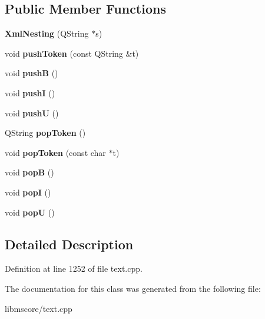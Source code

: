 \subsection*{Public Member Functions}
\begin{DoxyCompactItemize}
\item 
\mbox{\label{class_ms_1_1_xml_nesting_a53b2d7feea754c82c3c0753dabdbf22c}} 
{\bfseries Xml\+Nesting} (Q\+String $\ast$s)
\item 
\mbox{\label{class_ms_1_1_xml_nesting_ac5951c62df1bb683e9d701e2a332b24b}} 
void {\bfseries push\+Token} (const Q\+String \&t)
\item 
\mbox{\label{class_ms_1_1_xml_nesting_aecbfdf50979de2b90ab83b34ae468466}} 
void {\bfseries pushB} ()
\item 
\mbox{\label{class_ms_1_1_xml_nesting_ae0dd8bd06249a337c83cb65b5cafafbc}} 
void {\bfseries pushI} ()
\item 
\mbox{\label{class_ms_1_1_xml_nesting_a7536452053864d7cb6fb98e9b4075ede}} 
void {\bfseries pushU} ()
\item 
\mbox{\label{class_ms_1_1_xml_nesting_ade6092f87c40c940433b3e313df54c58}} 
Q\+String {\bfseries pop\+Token} ()
\item 
\mbox{\label{class_ms_1_1_xml_nesting_a0ac5060dfdfe109f612b9f6a4ef831d2}} 
void {\bfseries pop\+Token} (const char $\ast$t)
\item 
\mbox{\label{class_ms_1_1_xml_nesting_ae43b2198830e5c5b6a9b281cc95626f3}} 
void {\bfseries popB} ()
\item 
\mbox{\label{class_ms_1_1_xml_nesting_a98755af9fb0d81570eaf5d65f5ced853}} 
void {\bfseries popI} ()
\item 
\mbox{\label{class_ms_1_1_xml_nesting_aa4c111b0dc56d3231bfb25543f42ea4d}} 
void {\bfseries popU} ()
\end{DoxyCompactItemize}


\subsection{Detailed Description}


Definition at line 1252 of file text.\+cpp.



The documentation for this class was generated from the following file\+:\begin{DoxyCompactItemize}
\item 
libmscore/text.\+cpp\end{DoxyCompactItemize}

